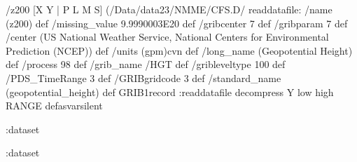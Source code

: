 \begin{ingrid}
 /z200{
[X
    Y  |
     P L M S] (/Data/data23/NMME/CFS.D/%
readdatafile:
/name (z200) def
/missing_value 9.9990003E20 def
/gribcenter 7 def
/gribparam 7 def
/center (US National Weather Service, National Centers for Environmental Prediction (NCEP)) def
/units (gpm)cvn def
/long_name (Geopotential Height) def
/process 98 def
/grib_name /HGT def
/gribleveltype 100 def
/PDS_TimeRange 3 def
/GRIBgridcode 3 def
/standard_name (geopotential_height) def
 GRIB1record :readdatafile
decompress
Y low high RANGE
}defasvarsilent

\end{ingrid}
\begin{ingrid}

 :dataset

:dataset
\end{ingrid}

